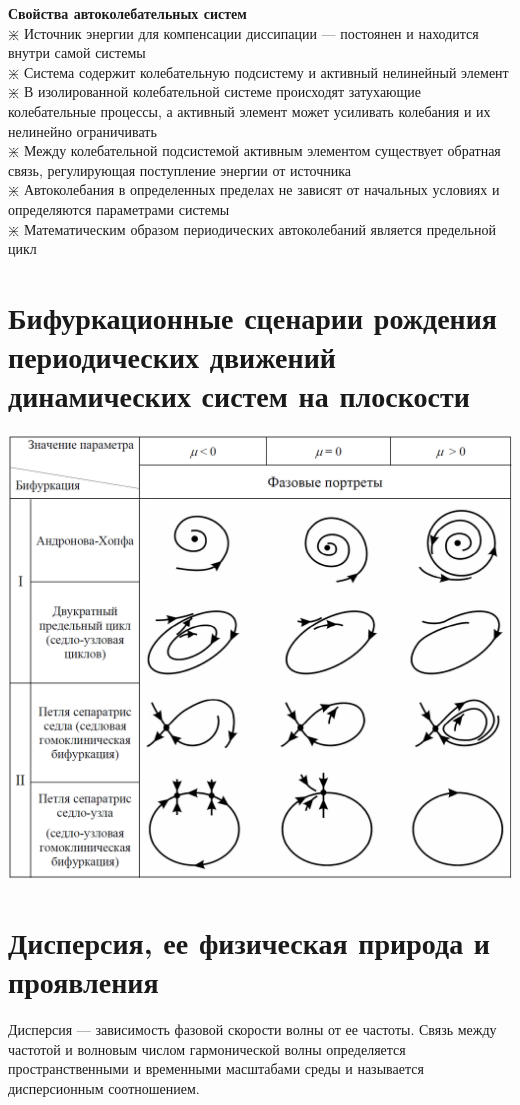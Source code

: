 \begin{multicols*}{2}
		\textbf{Свойства автоколебательных систем}\\
		$\divideontimes$ Источник энергии для компенсации диссипации — постоянен и находится внутри самой системы\\
		$\divideontimes$ Система содержит колебательную подсистему и активный нелинейный элемент\\
		$\divideontimes$ В изолированной колебательной системе происходят затухающие колебательные процессы, а активный элемент может усиливать колебания и их нелинейно ограничивать\\
		$\divideontimes$ Между колебательной подсистемой активным элементом существует обратная связь, регулирующая поступление энергии от источника\\
		$\divideontimes$ Автоколебания в определенных пределах не зависят от начальных условиях и определяются параметрами системы\\
		$\divideontimes$ Математическим образом периодических автоколебаний является предельной цикл
		
		\section{Бифуркационные сценарии рождения периодических движений динамических систем на плоскости}
		\includegraphics[width=0.75\linewidth]{tk_img/bifurk.png}
		
		\section{Дисперсия, ее физическая природа и проявления}
		Дисперсия — зависимость фазовой скорости волны от ее частоты. Связь между частотой и волновым числом гармонической волны определяется пространственными и временными масштабами среды и называется дисперсионным соотношением.
		

\end{multicols*}
